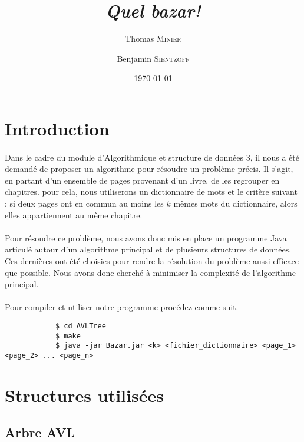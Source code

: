 \documentclass[a4paper]{article}
\title{\textit{Quel bazar!}}
\author{Thomas \textsc{Minier} \and Benjamin \textsc{Sientzoff}}
\date{\today}
\begin{document}
	\maketitle
	\vspace{5cm}
	\tableofcontents
	\newpage %
	
	\section*{Introduction}

		\paragraph{}{
		Dans le cadre du module d'Algorithmique et structure de données 3, il nous a été demandé de proposer un algorithme pour résoudre un problème précis. Il s'agit, en partant d'un ensemble de pages provenant d'un livre, de les regrouper en chapitres. pour cela, nous utiliserons un dictionnaire de mots et le critère suivant : si deux pages ont en commun au moins les $k$ mêmes mots du dictionnaire, alors elles appartiennent au même chapitre.
		}
		
		\paragraph{}{
		Pour résoudre ce problème, nous avons donc mis en place un programme Java articulé autour d'un algorithme principal et de plusieurs structures de données. Ces dernières ont été choisies pour rendre la résolution du problème aussi efficace que possible. Nous avons donc cherché à minimiser la complexité de l'algorithme principal.
		}
		
		\paragraph{}{
		Pour compiler et utiliser notre programme procédez comme suit.
		\begin{verbatim}
			$ cd AVLTree
			$ make
			$ java -jar Bazar.jar <k> <fichier_dictionnaire> <page_1> <page_2> ... <page_n>
		\end{verbatim}
		}
		
		
	\section{Structures utilisées}
	
		\subsection{Arbre AVL}
		
\end{document}
